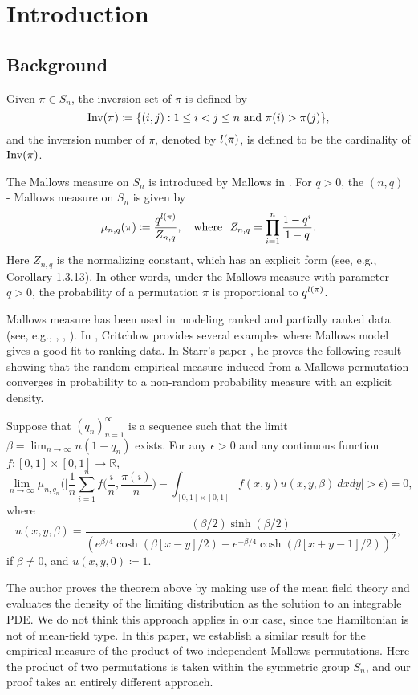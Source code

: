 \section{Introduction}\label{S1}

\subsection{Background}
\begin{definition}
Given $\pi \in S_n$, the inversion set of $\pi$ is defined by
\[
\text{Inv}(\pi) \coloneqq \{ (i, j) : 1 \le i < j \le n \text{ and } \pi(i) > \pi(j) \},
\]
and the inversion number of $\pi$, denoted by $l(\pi)$, is defined to be the cardinality of $\text{Inv}(\pi)$.
\end{definition}
The Mallows measure on $S_n$ is introduced by Mallows in \cite{mallows1957}. For $q > 0$, the $(n, q)$ - Mallows measure on $S_n$ is given by
\[
\mu_{n, q}(\pi) \coloneqq \frac{q^{l(\pi)}}{Z_{n, q}}, \quad \text{where }\  Z_{n, q} = \prod_{i = 1}^n \frac{1 - q^i}{1 - q}.
\]
Here $Z_{n, q}$ is the normalizing constant, which has an explicit form (see, e.g., \cite{Stanley} Corollary 1.3.13). In other words, under the Mallows measure with parameter $q>0$, the probability of a permutation $\pi$ is proportional to $q^{l(\pi)}$. 

Mallows measure has been used in modeling ranked and partially ranked data (see, e.g., \cite{CR}, \cite{FV}, \cite{Ma}). In \cite{CR}, Critchlow provides several examples where Mallows model gives a good fit to ranking data.
In Starr's paper \cite{Starr}, he proves the following result showing that the random empirical measure induced from a Mallows permutation converges in probability to a non-random probability measure with an explicit density. 




\begin{theorem}[S.Starr]\label{T1}
Suppose that $(q_n)_{n=1}^{\infty}$ is a sequence such that the limit $\beta = \lim_{n\to\infty} n (1-q_n)$ exists. For any $\epsilon >0$ and any continuous function $f: [0, 1]\times[0,1] \to \mathbb{R}$,
\[
\lim_{n\to \infty} \mu_{n, q_n}
\bigg(\bigg|\frac{1}{n}\sum_{i=1}^{n}f\Big(\frac{i}{n}, \frac{\pi(i)}{n}\Big) -
 \int_{[0,1]\times[0,1]} f(x,y)u(x,y,\beta)\ dxdy\bigg|>\epsilon \bigg) = 0,
\]
where
\begin{equation}\label{eq:t1}
u(x, y, \beta) = \frac{(\beta/2) \sinh(\beta/2)}{\left(e^{\beta/4} \cosh(\beta[x-y]/2)-e^{-\beta/4}\cosh(\beta[x+y-1]/2)\right)^2},
\end{equation}
if $\beta \neq 0$, and $u(x, y, 0) \coloneqq 1$.
\end{theorem}
The author proves the theorem above by making use of the mean field theory and evaluates the density of the limiting distribution as the solution to an integrable PDE. We do not think this approach applies in our case, since the Hamiltonian is not of mean-field type. In this paper, we establish a similar result for the empirical measure of the product of two independent Mallows permutations. Here the product of two permutations is taken within the symmetric group $S_n$, and our proof takes an entirely different approach.

